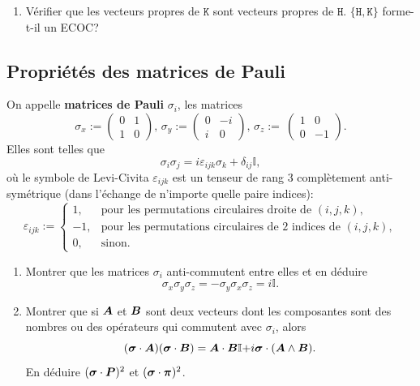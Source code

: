 \begin{itemize}
\begin{enumerate}
\item Vérifier que les vecteurs propres de $\mathtt{K}$ sont vecteurs propres
de $\mathtt{H}$. $\{\mathtt{H},\mathtt{K}\}$ forme-t-il un ECOC?
\end{enumerate}


\subsection{Propriétés des matrices de Pauli}

On appelle \textbf{matrices de Pauli} $\sigma_{i}$, les matrices
\begin{equation}
\sigma_{x}:=\begin{pmatrix}
0 & 1\\
1 & 0
\end{pmatrix},\,
\sigma_{y}:=
\begin{pmatrix}
0 & -i\\
i & 0
\end{pmatrix},\,
\sigma_{z}:=\
\begin{pmatrix}
1 & 0\\
0 & -1
\end{pmatrix}.
\label{eq:MPauli}%
\end{equation}
Elles sont telles que%
\begin{equation}
\sigma_{i}\sigma_{j}=i\varepsilon_{ijk}\sigma_{k}+\delta_{ij}\mathbb{I},
\end{equation}
où le symbole de Levi-Civita
$\varepsilon_{ijk}$ est un tenseur de rang $3$ complètement anti-symétrique
(dans l'échange de n'importe quelle paire indices):
\begin{equation}
\varepsilon_{ijk}:=\begin{cases}
1, & \text{pour les permutations circulaires droite de }(i,j,k),\\
-1, & \text{pour les permutations circulaires de 2 indices de }(i,j,k),\\
0, & \text{sinon.}
\end{cases}
\end{equation}

\begin{enumerate}
\item Montrer que les matrices $\sigma_{i}$ anti-commutent entre elles et en
déduire
\begin{equation}
\sigma_{x}\sigma_{y}\sigma_{z}=-\sigma_{y}\sigma_{x}\sigma_{z}=i\mathbb{I}.
\end{equation}

\item Montrer que si $\boldsymbol{A}$ et $\boldsymbol{B}$ sont deux vecteurs dont les
composantes sont des nombres ou des opérateurs qui commutent avec $\sigma_{i}$,
alors
\begin{equation}
(\boldsymbol{\sigma}\cdot\boldsymbol{A})(\boldsymbol{\sigma}\cdot\boldsymbol{B})=\boldsymbol{A}\cdot
\boldsymbol{B}\mathbb{I+}i\boldsymbol{\sigma}\cdot(\boldsymbol{A}\wedge\boldsymbol{B}).
\end{equation}
En déduire $(\boldsymbol{\sigma}\cdot\boldsymbol{P})^{2}$ et
$(\boldsymbol{\sigma}\cdot\boldsymbol{\pi})^{2}$.


\end{enumerate}
\end{itemize}
